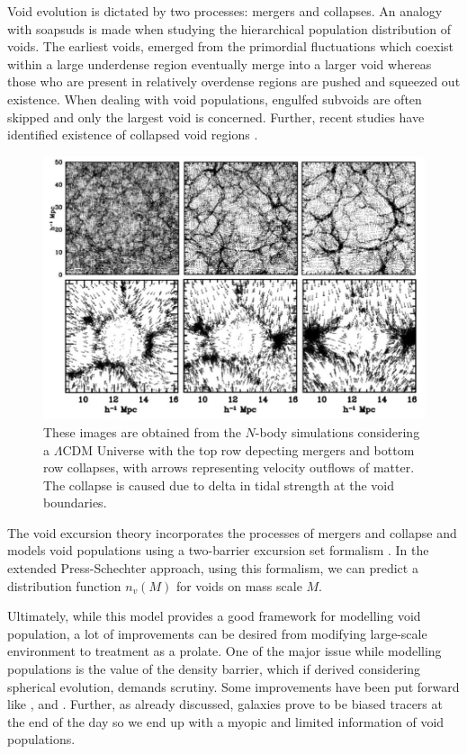 \documentclass[fleqn,usenatbib]{mnras}
\begin{document}
Void evolution is dictated by two processes: mergers and collapses. An analogy with soapsuds is made when studying the hierarchical population distribution of voids. The earliest voids, emerged from the primordial fluctuations which coexist within a large underdense region eventually merge into a larger void whereas those who are present in relatively overdense regions are pushed and squeezed out existence. When dealing with void populations, engulfed subvoids are often skipped and only the largest void is concerned. Further, recent studies have identified existence of collapsed void regions \citep{paz_clues_2013}. 
\begin{figure}
	\centering
	\includegraphics[scale=0.35]{mergecollapse}
	\caption{These images are obtained from the $ N $-body simulations considering a $ \Lambda $CDM Universe with the top row depecting mergers and bottom row collapses, with arrows representing velocity outflows of matter. The collapse is caused due to delta in tidal strength at the void boundaries.}
	\label{fig:mergecollapse}
\end{figure}

The void excursion theory incorporates the processes of mergers and collapse and models void populations using a two-barrier excursion set formalism \citep{sheth_hierarchy_2004}. In the extended Press-Schechter approach, using this formalism, we can predict a distribution function $ n_v (M) $ for voids on mass scale $ M $.

Ultimately, while this model provides a good framework for modelling void population, a lot of improvements can be desired from modifying large-scale environment to treatment as a prolate. One of the major issue while modelling populations is the value of the density barrier, which if derived considering spherical evolution, demands scrutiny. Some improvements have been put forward like \cite{paranjape_hierarchy_2012}, \cite{jennings_abundance_2013} and \cite{pontzen_inverted_2016}. Further, as already discussed, galaxies prove to be biased tracers at the end of the day so we end up with a myopic and limited information of void populations.
\end{document}
